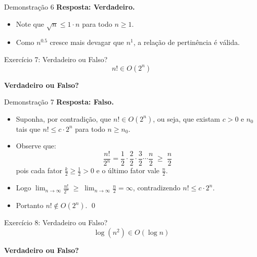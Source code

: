 \documentclass[aspectratio=169]{beamer}
\begin{document}
\begin{frame}{Demonstração 6}
    \textbf{Resposta: Verdadeiro.}
    \centering
    \begin{itemize}
        \item Note que $\sqrt{n} \le 1 \cdot n$ para todo $n \ge 1$.
        \item Como $n^{0.5}$ cresce mais devagar que $n^1$, a relação de pertinência é válida.
    \end{itemize}
\end{frame}

\begin{frame}{Exercício 7: Verdadeiro ou Falso?}
    \Large
    \[ n! \in O(2^n) \]
    \begin{center}
        \textbf{Verdadeiro ou Falso?}
    \end{center}
\end{frame}


\begin{frame}{Demonstração 7}
    \textbf{Resposta: Falso.}
    \begin{itemize}
        \item Suponha, por contradição, que $n! \in O(2^n)$, ou seja,
              que existam $c > 0$ e $n_0$ tais que
              $n! \leq c \cdot 2^n$ para todo $n \geq n_0$.
        \item Observe que:
        \[
            \frac{n!}{2^n}
            = \frac{1}{2}\cdot\frac{2}{2}\cdot\frac{3}{2}\cdots\frac{n}{2}
            \;\geq\; \frac{n}{2}
        \]
        pois cada fator $\tfrac{k}{2} \geq \tfrac{1}{2} > 0$
        e o último fator vale $\tfrac{n}{2}$.
        \item Logo $\displaystyle\lim_{n \to \infty} \frac{n!}{2^n}
              \;\geq\; \lim_{n\to\infty}\frac{n}{2} = \infty$,
              contradizendo $n! \leq c \cdot 2^n$.
        \item Portanto $n! \notin O(2^n)$. \qed
    \end{itemize}
\end{frame}

\begin{frame}{Exercício 8: Verdadeiro ou Falso?}
    \Large
    \[ \log(n^2) \in O(\log n) \]
    \begin{center}
        \textbf{Verdadeiro ou Falso?}
    \end{center}
\end{frame}
\end{document}

